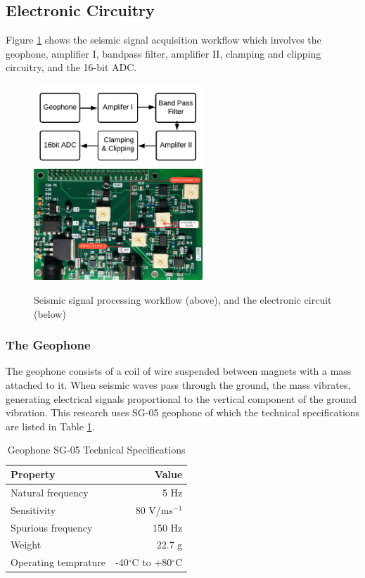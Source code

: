 \documentclass[applsci,article,accept,moreauthors,pdftex]{Definitions/mdpi}
\begin{document}
\subsection{Electronic Circuitry}
Figure \ref{hw design} shows the seismic signal acquisition workflow which involves the geophone, amplifier I, bandpass filter, amplifier II, clamping and clipping circuitry, and the 16-bit ADC.  
\begin{figure}[h]
	\begin{center}
		\includegraphics[width=2.5in]{figures/cct_block}\\
		\includegraphics[width=2.5in]{figures/circuit}
		\caption{Seismic signal processing workflow (above), and the electronic circuit (below)}
		\label{hw design}
	\end{center}
\end{figure}

\subsubsection{The Geophone}
The geophone consists of a coil of wire suspended between magnets with a mass attached to it. When seismic waves pass through the ground, the mass vibrates, generating electrical signals proportional to the vertical component of the ground vibration. This research uses SG-05 geophone of which the technical specifications are listed in Table \ref{table:geophone}. 
\begin{table}[h]
	\caption{Geophone SG-05 Technical Specifications}
	\centering
	\begin{tabular}{l r}
		\hline\hline
		Property & Value\\
		\hline
		Natural frequency &  5 Hz\\
		Sensitivity &  80 V/ms$^{-1}$\\
		Spurious frequency &  150 Hz\\
		Weight  &  22.7 g\\
		Operating temprature  &  -40$^{\circ}$C to +80$^{\circ}$C\\
		\hline
	\end{tabular}
	\label{table:geophone}
\end{table}
\end{document}
